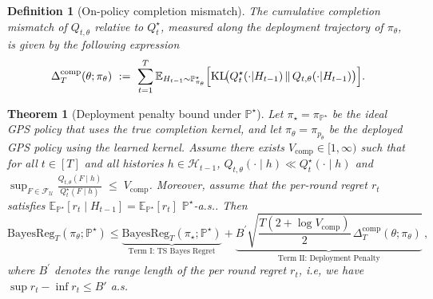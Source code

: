 \documentclass[11pt]{article}
\newtheorem{theorem}{Theorem}
\newtheorem{definition}{Definition}
\renewcommand{\P}{\mathbb{P}}
\providecommand{\E}{\mathbb{E}}
\DeclareMathOperator{\KL}{KL}
\providecommand{\BReg}{\mathrm{BayesReg}}
\begin{document}
\begin{definition}[On-policy completion mismatch]\label{def:completion-mismatch}
The cumulative \emph{completion mismatch} of \(Q_{t,\theta}\) relative to \(Q_t^\star\), measured along the
deployment trajectory of \(\pi_\theta\), is given by the following expression
\[
\Delta_T^{\mathrm{comp}}(\theta;\pi_\theta)
\ :=\
\sum_{t=1}^T
\mathbb{E}_{H_{t-1}\sim \P^\star_{\pi_\theta}}
\Bigl[
\KL\!\bigl(Q_t^\star(\cdot|H_{t-1})\,\|\,Q_{t,\theta}(\cdot|H_{t-1})\bigr)
\Bigr].
\]
\end{definition}

\begin{theorem}[Deployment penalty bound under $\P^\star$]
\label{thm:sec25_deploy}
Let $\pi_\star=\pi_{\P^\star}$ be the ideal GPS policy that uses the true completion kernel, and
let $\pi_\theta=\pi_{p_\theta}$ be the deployed GPS policy using the learned kernel. Assume there exists \(V_{\mathrm{comp}}\in[1,\infty)\) such that for all $t\in[T]$ and all histories \(h\in\mathcal{H}_{t-1}\),
\(Q_{t,\theta}(\cdot\mid h)\ll Q^\star_t(\cdot\mid h)\) and
\(
\sup_{F\in\mathcal{F}_{\mathcal{U}}}
\frac{Q_{t,\theta}(F\mid h)}{Q^\star_t(F\mid h)}
\;\le\;
V_{\mathrm{comp}}
\).
Moreover, assume that the per-round regret $r_t$ satisfies $\E_{\P^\star}[r_t \mid H_{t-1}] = \E_{\P^\star}[r_t]$ $\P^\star$-a.s..
Then
\begin{equation}
\label{eq:sec25_deploy}
\BReg_T(\pi_\theta;\P^\star)
\le
\underbrace{\BReg_T(\pi_\star;\P^\star)}_{\text{Term I: TS Bayes Regret}}
+
\underbrace{B^\prime\sqrt{\frac{T\left(2+\log V_{\mathrm{comp}}\right)}{2}\,\Delta^{\mathrm{comp}}_{T}(\theta;\pi_\theta)}}_{\text{Term II: Deployment Penalty}}
\,,
\end{equation}
where $B^\prime$ denotes the range length of the per round regret $r_t$, i.e, we have $\sup r_t - \inf r_t \le B'$ a.s.
\end{theorem}
\end{document}
